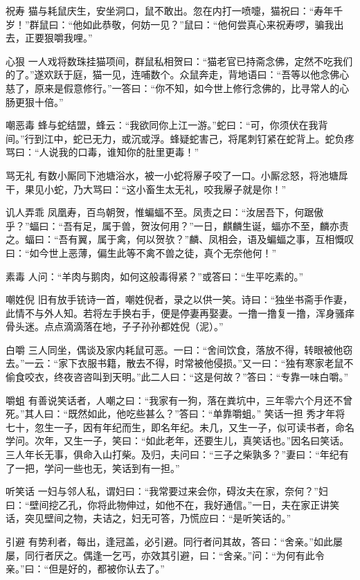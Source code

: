 \documentclass[12pt,UTF8]{ctexbook}
\begin{document}
祝寿
猫与耗鼠庆生，安坐洞口，鼠不敢出。忽在内打一喷嚏，猫祝曰：“寿年千岁！”群鼠曰：“他如此恭敬，何妨一见？”鼠曰：“他何尝真心来祝寿啰，骗我出去，正要狠嚼我哩。”

心狠
一人戏将数珠挂猫项间，群鼠私相贺曰：“猫老官已持斋念佛，定然不吃我们的了。”遂欢跃于庭，猫一见，连哺数个。众鼠奔走，背地语曰：“吾等以他念佛心慈了，原来是假意修行。”一答曰：“你不知，如今世上修行念佛的，比寻常人的心肠更狠十倍。”

嘲恶毒
蜂与蛇结盟，蜂云：“我欲同你上江一游。”蛇曰：“可，你须伏在我背间。”行到江中，蛇已无力，或沉或浮。蜂疑蛇害己，将尾刺钉紧在蛇背上。蛇负疼骂曰：“人说我的口毒，谁知你的肚里更毒！”

骂无礼
有数小厮同下池塘浴水，被一小蛇将屪子咬了一口。小厮忿怒，将池塘戽干，果见小蛇，乃大骂曰：“这小畜生太无礼，咬我屪子就是你！”

讥人弄乖
凤凰寿，百鸟朝贺，惟蝙蝠不至。凤责之曰：“汝居吾下，何踞傲乎？”蝠曰：“吾有足，属于兽，贺汝何用？”一日，麒麟生诞，蝠亦不至，麟亦责之。蝠曰：“吾有翼，属于禽，何以贺欤？”麟、凤相会，语及蝙蝠之事，互相慨叹曰：“如今世上恶薄，偏生此等不禽不兽之徒，真个无奈他何！”

素毒
人问：“羊肉与鹅肉，如何这般毒得紧？”或答曰：“生平吃素的。”

嘲姓倪
旧有放手铳诗一首，嘲姓倪者，录之以供一笑。诗曰：“独坐书斋手作妻，此情不与外人知。若将左手换右手，便是停妻再娶妻。一撸一撸复一撸，浑身骚痒骨头迷。点点滴滴落在地，子子孙孙都姓倪（泥）。”

白嚼
三人同坐，偶谈及家内耗鼠可恶。一曰：“舍间饮食，落放不得，转眼被他窃去。”一云：“家下衣服书籍，散去不得，时常被他侵损。”又一曰：“独有寒家老鼠不偷食咬衣，终夜咨咨叫到天明。”此二人曰：“这是何故？”答曰：“专靠一味白嚼。”

嚼蛆
有善说笑话者，人嘲之曰：“我家有一狗，落在粪坑中，三年零六个月还不曾死。”其人曰：“既然如此，他吃些甚么？”答曰：“单靠嚼蛆。”
笑话一担
秀才年将七十，忽生一子，因有年纪而生，即名年纪。未几，又生一子，似可读书者，命名学问。次年，又生一子，笑曰：“如此老年，还要生儿，真笑话也。”因名曰笑话。三人年长无事，俱命入山打柴。及归，夫问曰：“三子之柴孰多？”妻曰：“年纪有了一把，学问一些也无，笑话到有一担。”

听笑话
一妇与邻人私，谓妇曰：“我常要过来会你，碍汝夫在家，奈何？”妇曰：“壁间挖乙孔，你将此物伸过，如他不在，我好通信。”一日，夫在家正讲笑话，突见壁间之物，夫诘之，妇无可答，乃慌应曰：“是听笑话的。”

引避
有势利者，每出，逢冠盖，必引避。同行者问其故，答曰：“舍亲。”如此屡屡，同行者厌之。偶逢一乞丐，亦效其引避，曰：“舍亲。”问：“为何有此令亲。”曰：“但是好的，都被你认去了。”
\end{document}
